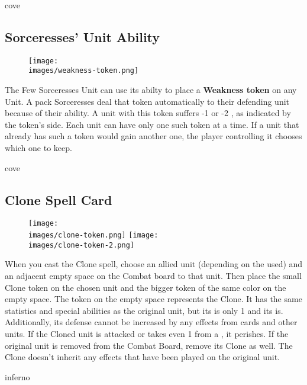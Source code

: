 \begin{multicols*}{2}
\begin{expansion}{cove}
	\subsection*{Sorceresses' Unit Ability}
  \setlength\intextsep{0pt}
  \setlength\columnsep{1em}
  \begin{wrapfigure}{r}{0.2\linewidth}
		\texttt{[image: \\images/weakness-token.png]}
	\end{wrapfigure}
  The Few Sorceresses Unit can use its  abilty to place a \textbf{Weakness token} on any Unit.
  A pack Sorceresses deal that token automatically to their defending unit because of their  ability.
  A unit with this token suffers -1  or -2 , as indicated by the token's side.
  Each unit can have only one such token at a time.
  If a unit that already has such a token would gain another one, the player controlling it chooses which one to keep.
\end{expansion}
\vspace*{1em}
\begin{expansion}{cove}
	\subsection*{Clone Spell Card}
  \setlength\intextsep{0pt}
  \setlength\columnsep{1em}
  \begin{wrapfigure}{r}{0.2\linewidth}
    \texttt{[image: \\images/clone-token.png]}\vspace*{1em}
		\texttt{[image: \\images/clone-token-2.png]}
	\end{wrapfigure}
  When you cast the Clone spell, choose an allied unit (depending on the  used) and an adjacent empty space on the Combat board to that unit.
  Then place the small Clone token on the chosen unit and the bigger token of the same color on the empty space.
  The token on the empty space represents the Clone.
	It has the same statistics and special abilities as the original unit, but its  is only 1 and its  is.
  Additionally, its defense cannot be increased by any effects from cards and other units. %
	If the Cloned unit is attacked or takes even 1  from a , it perishes.
  If the original unit is removed from the Combat Board, remove its Clone as well.
  The Clone doesn't inherit any effects that have been played on the original unit.
\end{expansion}
\vspace*{1em}
\begin{expansion}{inferno}

\end{expansion}
\end{multicols*}
